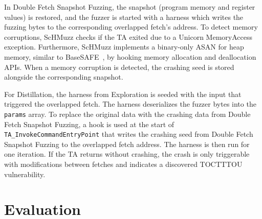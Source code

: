 \documentclass[conference]{IEEEtran}
\newcommand{\sysname}{ScHMuzz\xspace}
\newcommand{\taemu}{TÄMU\xspace}
\newcommand{\stageone}{Exploration\xspace}
\newcommand{\stagetwo}{Double Fetch Snapshot Fuzzing\xspace}
\newcommand{\stagethree}{Distillation\xspace}
\begin{document}
In \stagetwo, the snapshot (program memory and register values) is restored, and the fuzzer is started with a harness which 
writes the fuzzing bytes to the corresponding overlapped fetch's address. To detect memory corruptions, \sysname checks if 
the TA exited due to a Unicorn MemoryAccess exception. Furthermore, \sysname implements a binary-only ASAN for heap memory, 
similar to BaseSAFE~\cite{basesafe}, by hooking memory allocation and deallocation APIs. When a memory corruption is detected, 
the crashing seed is stored alongside the corresponding snapshot. 

For \stagethree, the harness from \stageone is seeded with the input that triggered the overlapped fetch. The harness deserializes 
the fuzzer bytes into the \texttt{params} array. 
To replace the original data with the 
crashing data from \stagetwo, a hook is used at the start of \texttt{TA\_InvokeCommandEntryPoint} that writes the crashing seed 
from \stagetwo to the overlapped fetch address. 
The harness is then run for one iteration. If the TA returns without crashing, the crash is only triggerable with modifications between fetches and indicates a discovered TOCTTTOU vulnerability.

% 

\section{Evaluation}\label{sec:evaluation}
\end{document}
